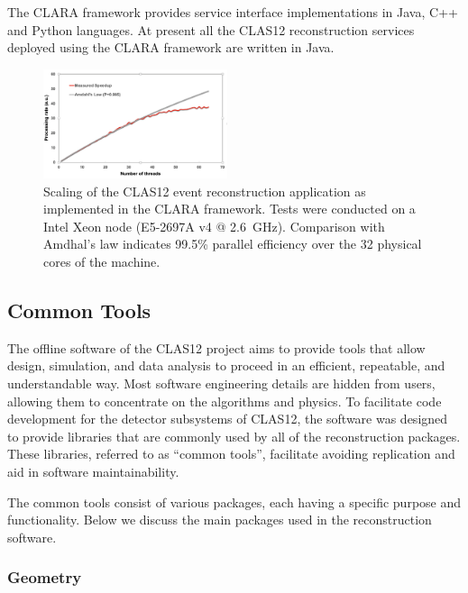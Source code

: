 The CLARA framework provides service interface implementations in Java, C++ and Python languages. 
At present all the CLAS12 reconstruction services deployed using the CLARA framework are written in Java.


\begin{figure}
\centering
\includegraphics[width=0.48\textwidth]{pics/scaling.png}
\caption{Scaling of the CLAS12 event reconstruction application as implemented in the CLARA framework. Tests
  were conducted on a Intel Xeon node (E5-2697A v4 @ 2.6~GHz). Comparison with Amdhal's law indicates 99.5\%
  parallel efficiency over the 32 physical cores of the machine.}
\label{fig:scaling}
\end{figure}

\subsection{Common Tools}
\label{common-tools}

The offline software of the CLAS12 project aims to provide tools that allow design, simulation, and data analysis
to proceed in an efficient, repeatable, and understandable way. Most  software engineering details are hidden from
users, allowing them to concentrate on the algorithms and physics. To facilitate code development for the detector
subsystems of CLAS12, the software was designed to provide libraries that are commonly used by all of the
reconstruction packages.  These libraries, referred to as ``common tools'', facilitate avoiding replication and aid
in software maintainability.

The common tools consist of various packages, each having a specific purpose and functionality. Below we discuss
the main packages used in the reconstruction software.

\subsubsection{Geometry}

